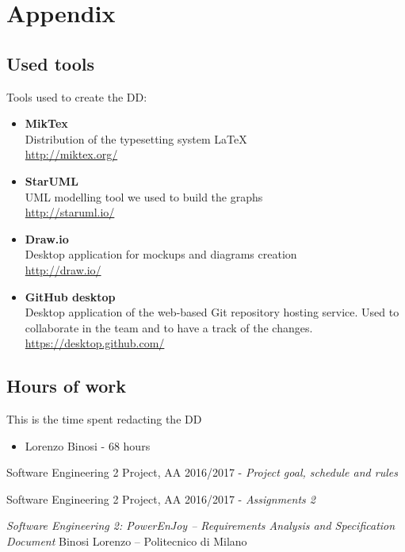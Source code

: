 \appendix

\section{Appendix}

\subsection{Used tools}
Tools used to create the DD:
\begin{itemize}
	\item \textbf{MikTex} \\ Distribution of the typesetting system LaTeX \\ \url{http://miktex.org/} 
	\item \textbf{StarUML}\\ UML modelling tool we used to build the graphs\\ \url{http://staruml.io/} 
	\item \textbf{Draw.io}\\ Desktop application for mockups and diagrams creation \\ \url{ http://draw.io/}
	\item \textbf{GitHub desktop}\\ Desktop application of the web-based Git repository hosting service. Used to collaborate in the team and to have a track of the changes.  \\ \url{https://desktop.github.com/} 
\end{itemize}

\subsection{Hours of work}
This is the time spent redacting the DD
\begin{itemize}
	\item {Lorenzo Binosi} - 68 hours
\end{itemize}

\begin{thebibliography}{1}	
	Software Engineering 2 Project, AA 2016/2017 - \emph{Project goal, schedule and rules}
	
	Software Engineering 2 Project, AA 2016/2017 - \emph{Assignments 2}

        	\emph{Software Engineering 2: PowerEnJoy –
        	Requirements Analysis and Specification Document}
        	Binosi Lorenzo – Politecnico di Milano
\end{thebibliography}